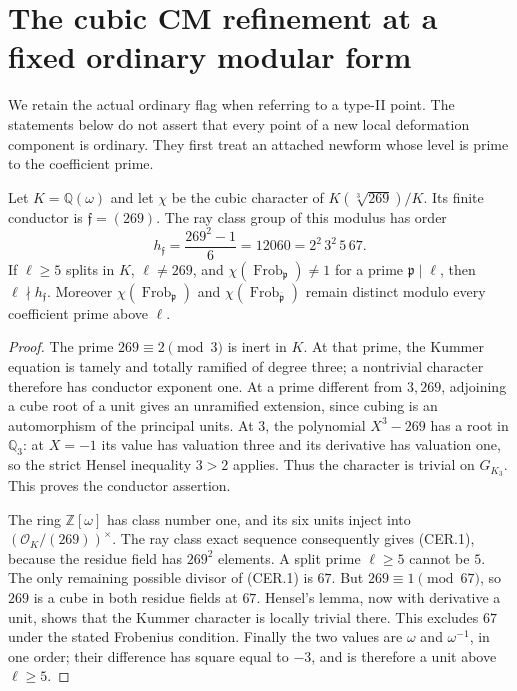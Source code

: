 \section{The cubic CM refinement at a fixed ordinary modular form}
\label{sec:cubic-cm-euler-refinement}

We retain the actual ordinary flag when referring to a type-II
point.  The statements below do not assert that every point of a
new local deformation component is ordinary.  They first treat
an attached newform whose level is prime to the coefficient prime.

\begin{lemma}
\label{AC-K29-ray-class}
Let $K=\mathbb Q(\omega)$ and let $\chi$ be the cubic character
of $K(\sqrt[3]{269})/K$.  Its finite conductor is
$\mathfrak f=(269)$.  The ray class group of this modulus has order
\[
       h_{\mathfrak f}=\frac{269^2-1}{6}
               =12060=2^2\,3^2\,5\,67.                 \tag{CER.1}
\]
If $\ell\ge5$ splits in $K$, $\ell\ne269$, and
$\chi(\operatorname{Frob}_{\mathfrak p})\ne1$ for a prime
$\mathfrak p\mid\ell$, then $\ell\nmid h_{\mathfrak f}$.
Moreover $\chi(\operatorname{Frob}_{\mathfrak p})$ and
$\chi(\operatorname{Frob}_{\overline{\mathfrak p}})$ remain
distinct modulo every coefficient prime above $\ell$.
\end{lemma}
\begin{proof}
The prime $269\equiv2\pmod3$ is inert in $K$.  At that prime,
the Kummer equation is tamely and totally ramified of degree
three; a nontrivial character therefore has conductor exponent
one.  At a prime different from $3,269$, adjoining a cube root
of a unit gives an unramified extension, since cubing is an
automorphism of the principal units.  At $3$, the polynomial
$X^3-269$ has a root in $\mathbb Q_3$: at $X=-1$ its value
has valuation three and its derivative has valuation one, so
the strict Hensel inequality $3>2$ applies.  Thus the character
is trivial on $G_{K_3}$.  This proves the conductor assertion.

The ring $\mathbb Z[\omega]$ has class number one, and its six
units inject into $(\mathcal O_K/(269))^\times$.
The ray class exact sequence consequently gives (CER.1),
because the residue field has $269^2$ elements.  A split prime
$\ell\ge5$ cannot be $5$.  The only remaining possible divisor
of (CER.1) is $67$.  But $269\equiv1\pmod{67}$, so $269$ is
a cube in both residue fields at $67$.  Hensel's lemma, now
with derivative a unit, shows that the Kummer character is
locally trivial there.  This excludes $67$ under the stated
Frobenius condition.  Finally the two values are $\omega$ and
$\omega^{-1}$, in one order; their difference has square
equal to $-3$, and is therefore a unit above $\ell\ge5$.
\end{proof}

